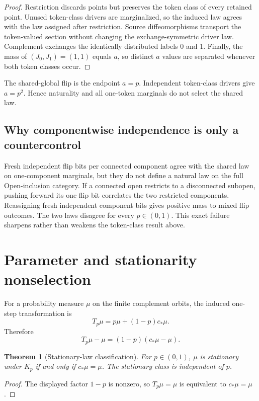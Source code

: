 \documentclass[11pt]{article}
\newtheorem{theorem}{Theorem}
\begin{document}
\begin{proof}
Restriction discards points but preserves the token class of every retained
point. Unused token-class drivers are marginalized, so the induced law agrees
with the law assigned after restriction. Source diffeomorphisms transport the
token-valued section without changing the exchange-symmetric driver law.
Complement exchanges the identically distributed labels $0$ and $1$.
Finally, the mass of $(J_0,J_1)=(1,1)$ equals $a$, so distinct $a$ values are
separated whenever both token classes occur.
\end{proof}

The shared-global flip is the endpoint $a=p$. Independent token-class drivers
give $a=p^2$. Hence naturality and all one-token marginals do not select the
shared law.

\subsection{Why componentwise independence is only a countercontrol}

Fresh independent flip bits per connected component agree with the shared law
on one-component marginals, but they do not define a natural law on the full
Open-inclusion category. If a connected open restricts to a disconnected
subopen, pushing forward its one flip bit correlates the two restricted
components. Reassigning fresh independent component bits gives positive mass
to mixed flip outcomes. The two laws disagree for every $p\in(0,1)$. This
exact failure sharpens rather than weakens the token-class result above.

\section{Parameter and stationarity nonselection}

For a probability measure $\mu$ on the finite complement orbits, the induced
one-step transformation is
\[
 T_p\mu=p\mu+(1-p)c_*\mu.
\]
Therefore
\[
 T_p\mu-\mu=(1-p)(c_*\mu-\mu).
\]

\begin{theorem}[Stationary-law classification]
For $p\in(0,1)$, $\mu$ is stationary under $K_p$ if and only if
$c_*\mu=\mu$. The stationary class is independent of $p$.
\end{theorem}

\begin{proof}
The displayed factor $1-p$ is nonzero, so $T_p\mu=\mu$ is equivalent to
$c_*\mu=\mu$.
\end{proof}
\end{document}
